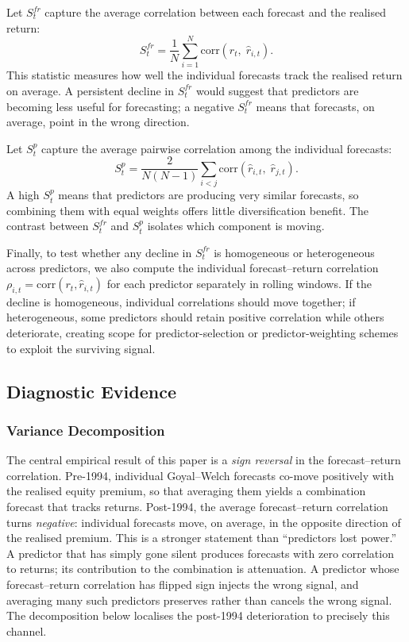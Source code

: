 \documentclass[a4paper,11pt]{article}
\begin{document}
Let $S^{fr}_t$ capture the average correlation between each forecast and
the realised return:
\begin{equation}\label{eq:sfr}
    S^{fr}_t = \frac{1}{N} \sum_{i=1}^{N}
    \mathrm{corr}\!\left(r_{t},\;\hat{r}_{i,t}\right).
\end{equation}
This statistic measures how well the individual forecasts track the
realised return on average. A persistent decline in $S^{fr}_t$ would
suggest that predictors are becoming less useful for forecasting; a
negative $S^{fr}_t$ means that forecasts, on average, point in the wrong
direction.

Let $S^{p}_t$ capture the average pairwise correlation among the
individual forecasts:
\begin{equation}\label{eq:sp}
    S^{p}_t = \frac{2}{N(N-1)} \sum_{i < j}
    \mathrm{corr}\!\left(\hat{r}_{i,t},\;\hat{r}_{j,t}\right).
\end{equation}
A high $S^{p}_t$ means that predictors are producing very similar
forecasts, so combining them with equal weights offers little
diversification benefit. The contrast between $S^{fr}_t$ and $S^{p}_t$
isolates which component is moving.

Finally, to test whether any decline in $S^{fr}_t$ is homogeneous or
heterogeneous across predictors, we also compute the individual
forecast--return correlation $\rho_{i,t} = \mathrm{corr}(r_{t},
\hat{r}_{i,t})$ for each predictor separately in rolling windows. If the
decline is homogeneous, individual correlations should move together; if
heterogeneous, some predictors should retain positive correlation while
others deteriorate, creating scope for predictor-selection or
predictor-weighting schemes to exploit the surviving signal.

\subsection{Diagnostic Evidence}\label{subsec:diagnostic-evidence}

\subsubsection{Variance Decomposition}

The central empirical result of this paper is a \emph{sign reversal} in
the forecast--return correlation. Pre-1994, individual Goyal--Welch
forecasts co-move positively with the realised equity premium, so that
averaging them yields a combination forecast that tracks returns. Post-1994,
the average forecast--return correlation turns \emph{negative}: individual
forecasts move, on average, in the opposite direction of the realised
premium. This is a stronger statement than ``predictors lost power.'' A
predictor that has simply gone silent produces forecasts with zero
correlation to returns; its contribution to the combination is attenuation.
A predictor whose forecast--return correlation has flipped sign injects
the wrong signal, and averaging many such predictors preserves rather than
cancels the wrong signal. The decomposition below localises the post-1994
deterioration to precisely this channel.
\end{document}

